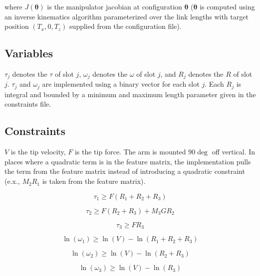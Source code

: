 \documentclass{article}
\begin{document}
where ${J(\bm{\theta})}$ is the manipulator jacobian at configuration
$\bm{\theta}$ ($\bm{\theta}$ is computed using an inverse kinematics algorithm
parameterized over the link lengths with target position $(T_x, 0, T_z)$
supplied from the configuration file).

\FloatBarrier{}
\subsection{Variables}

$\tau_j$ denotes the $\tau$ of slot $j$, $\omega_j$ denotes the $\omega$ of
slot $j$, and $R_j$ denotes the $R$ of slot $j$. $\tau_j$ and $\omega_j$ are
implemented using a binary vector for each slot $j$. Each $R_j$ is integral and
bounded by a minimum and maximum length parameter given in the constraints
file.

\FloatBarrier{}
\subsection{Constraints}

$V$ is the tip velocity, $F$ is the tip force. The arm is mounted $90 \deg$ off
vertical. In places where a quadratic term is in the feature matrix, the
implementation pulls the term from the feature matrix instead of introducing a
quadratic constraint (e.x., $M_2 R_1$ is taken from the feature matrix).

\begin{equation}
    \tau_{1} \geq F \left( R_1 + R_2 + R_3 \right)
\end{equation}

\begin{equation}
    \tau_{2} \geq F \left( R_2 + R_3 \right) + M_3 G R_2
\end{equation}

\begin{equation}
    \tau_{3} \geq F R_3
\end{equation}

\begin{equation}
    \ln(\omega_{1}) \geq \ln(V) - \ln(R_1 + R_2 + R_3)
\end{equation}

\begin{equation}
    \ln(\omega_{2}) \geq \ln(V) - \ln(R_2 + R_3)
\end{equation}

\begin{equation}
    \ln(\omega_{3}) \geq \ln(V) - \ln(R_3)
\end{equation}
\end{document}
